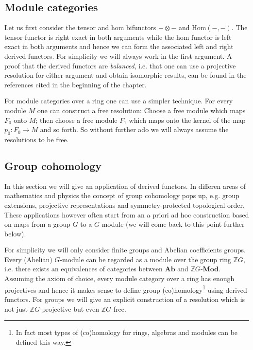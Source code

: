 \subsection{Module categories}\label{section:tor_ext}

	Let us first consider the tensor and hom bifunctors $-\otimes-$ and Hom$(-, -)$. The tensor functor is right exact in both arguments while the hom functor is left exact in both arguments and hence we can form the associated left and right derived functors. For simplicity we will always work in the first argument. A proof that the derived functors are \textit{balanced}, i.e. that one can use a projective resolution for either argument and obtain isomorphic results, can be found in the references cited in the beginning of the chapter.
	
	
	
	For module categories over a ring one can use a simpler technique. For every module $M$ one can construct a free resolution: Choose a free module which maps $F_0$ onto $M$; then choose a free module $F_1$ which maps onto the kernel of the map $p_0:F_0\rightarrow M$ and so forth. So without further ado we will always assume the resolutions to be free.

\subsection{Group cohomology}

	In this section we will give an application of derived functors. In differen areas of mathematics and physics the concept of group cohomology pops up, e.g. group extensions, projective representations and symmetry-protected topological order. These applications however often start from an a priori ad hoc construction based on maps from a group $G$ to a $G$-module (we will come back to this point further below).
	
	For simplicity we will only consider finite groups and Abelian coefficients groups. Every (Abelian) $G$-module can be regarded as a module over the group ring $\mathbb{Z}G$, i.e. there exists an equivalences of categories between $\mathbf{Ab}$ and $\mathbb{Z}G$-$\mathbf{Mod}$. Assuming the axiom of choice, every module category over a ring has enough projectives and hence it makes sense to define group (co)homology\footnote{In fact most types of (co)homology for rings, algebras and modules can be defined this way.} using derived functors. For groups we will give an explicit construction of a resolution which is not just $\mathbb{Z}G$-projective but even $\mathbb{Z}G$-free.
	
